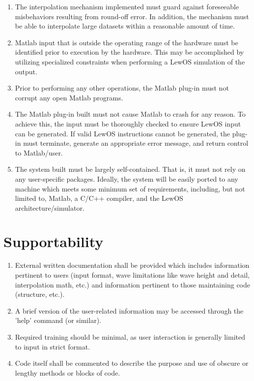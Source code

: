 \documentclass[12pt]{article}
\begin{document}
\begin{enumerate}
\item The interpolation mechanism implemented must guard against foreseeable misbehaviors resulting from round-off error.  In addition, the mechanism must be able to interpolate large datasets within a reasonable amount of time.
\item Matlab input that is outside the operating range of the hardware must be identified prior to execution by the hardware.  This may be accomplished by utilizing specialized constraints when performing a LewOS simulation of the output.
\item Prior to performing any other operations, the Matlab plug-in must not corrupt any open Matlab programs.
\item The Matlab plug-in built must not cause Matlab to crash for any reason. To achieve this, the input must be thoroughly checked to ensure LewOS input can be generated. If valid LewOS instructions cannot be generated, the plug-in must terminate, generate an appropriate error message, and return control to Matlab/user.
\item The system built must be largely self-contained. That is, it must not rely on any user-specific packages. Ideally, the system will be easily ported to any machine which meets some minimum set of requirements, including, but not limited to, Matlab, a C/C++ compiler, and the LewOS architecture/simulator.
\end{enumerate}


\section{Supportability}

\begin{enumerate}
\item External written documentation shall be provided which includes information pertinent to users (input format, wave limitations like wave height and detail, interpolation math, etc.) and information pertinent to those maintaining code (structure, etc.).
\item A brief version of the user-related information may be accessed through the 'help' command (or similar).
\item Required training should be minimal, as user interaction is generally limited to input in strict format.
\item Code itself shall be commented to describe the purpose and use of obscure or lengthy methods or blocks of code.
\end{enumerate}
\end{document}
